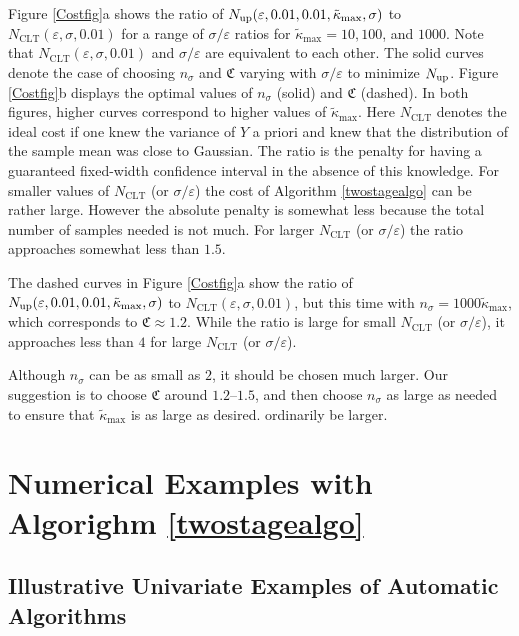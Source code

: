 \documentclass[graybox]{svmult}
\newcommand{\fudge}{\mathfrak{C}}
\newcommand{\tkappa}{\tilde{\kappa}}
\begin{document}
Figure \ref{Costfig}a shows the ratio of $N_{\rm{up}}(\varepsilon,0.01,0.01, \tkappa_{\max}, \sigma)$ to $N_{\mathrm{CLT}}(\varepsilon,\sigma,0.01)$ for a range of $\sigma/\varepsilon$ ratios for $\tkappa_{\max}=10,100$, and $1000$.  Note that $N_{\mathrm{CLT}}(\varepsilon,\sigma,0.01)$ and $\sigma/\varepsilon$ are equivalent to each other. The solid curves denote the case of choosing $n_\sigma$ and $\fudge$ varying with $\sigma/\varepsilon$ to minimize $N_{\rm{up}}$.  Figure \ref{Costfig}b displays the optimal values of $n_\sigma$ (solid) and $\fudge$ (dashed).  In both figures, higher curves correspond to higher values of $\tkappa_{\max}$. Here $N_{\mathrm{CLT}}$ denotes the ideal cost if one knew the variance of $Y$ a priori and knew that the distribution of the sample mean was close to Gaussian. The ratio is the penalty for having a guaranteed fixed-width confidence interval in the absence of this knowledge.  For smaller values of $N_{\mathrm{CLT}}$ (or  $\sigma/\varepsilon$) the cost of Algorithm \ref{twostagealgo} can be rather large.  However the absolute penalty is somewhat less because the total number of samples needed is not much.  For larger $N_{\mathrm{CLT}}$ (or $\sigma/\varepsilon$) the ratio approaches somewhat less than $1.5$.

The dashed curves in Figure \ref{Costfig}a show the ratio of $N_{\rm{up}}(\varepsilon,0.01,0.01, \tkappa_{\max}, \sigma)$ to $N_{\mathrm{CLT}}(\varepsilon,\sigma,0.01)$, but this time with $n_\sigma=1000\tkappa_{\max}$, which corresponds to $\fudge \approx 1.2$. While the ratio is large for small $N_{\mathrm{CLT}}$ (or  $\sigma/\varepsilon$), it approaches less than $4$ for large $N_{\mathrm{CLT}}$ (or  $\sigma/\varepsilon$).

Although $n_\sigma$ can be as small as $2$, it should be chosen much larger.  Our suggestion is to choose $\fudge$ around $1.2$--$1.5$, and then choose $n_\sigma$ as large as needed to ensure that $\tkappa_{\max}$ is as large as desired.
ordinarily be larger.  

\section{Numerical Examples with Algorighm \ref{twostagealgo}} \label{numerexsec}

\subsection{Illustrative Univariate Examples of Automatic Algorithms}
\end{document}
